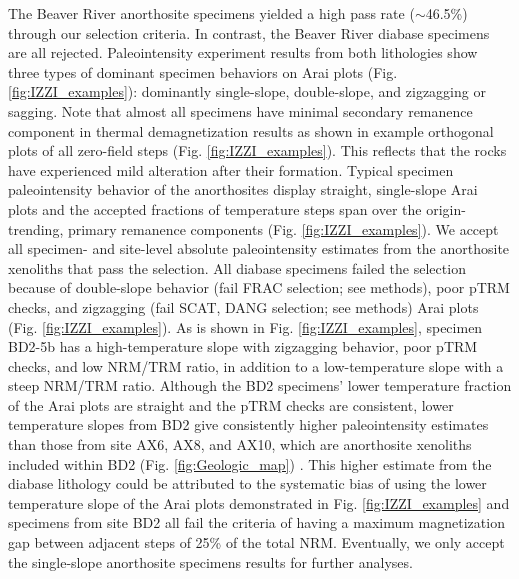 \documentclass[9pt,twocolumn,twoside,lineno]{pnas-new}
\begin{document}
The Beaver River anorthosite specimens yielded a high pass rate ($\sim$46.5\%) through our selection criteria. In contrast, the Beaver River diabase specimens are all rejected. Paleointensity experiment results from both lithologies show three types of dominant specimen behaviors on Arai plots (Fig. \ref{fig:IZZI_examples}): dominantly single-slope, double-slope, and zigzagging or sagging. Note that almost all specimens have minimal secondary remanence component in thermal demagnetization results as shown in example orthogonal plots of all zero-field steps (Fig. \ref{fig:IZZI_examples}). This reflects that the rocks have experienced mild alteration after their formation. Typical specimen paleointensity behavior of the anorthosites display straight, single-slope Arai plots and the accepted fractions of temperature steps span over the origin-trending, primary remanence components (Fig. \ref{fig:IZZI_examples}). We accept all specimen- and site-level absolute paleointensity estimates from the anorthosite xenoliths that pass the selection. All diabase specimens failed the selection because of double-slope behavior (fail FRAC selection; see methods), poor pTRM checks, and zigzagging (fail SCAT, DANG selection; see methods) Arai plots (Fig. \ref{fig:IZZI_examples}). As is shown in Fig. \ref{fig:IZZI_examples}, specimen BD2-5b has a high-temperature slope with zigzagging behavior, poor pTRM checks, and low NRM/TRM ratio, in addition to a low-temperature slope with a steep NRM/TRM ratio. Although the BD2 specimens' lower temperature fraction of the Arai plots are straight and the pTRM checks are consistent, lower temperature slopes from BD2 give consistently higher paleointensity estimates than those from site AX6, AX8, and AX10, which are anorthosite xenoliths included within BD2 (Fig. \ref{fig:Geologic_map}) \cite{Zhang2021a}. This higher estimate from the diabase lithology could be attributed to the systematic bias of using the lower temperature slope of the Arai plots demonstrated in Fig. \ref{fig:IZZI_examples} and specimens from site BD2 all fail the criteria of having a maximum magnetization gap between adjacent steps of 25\% of the total NRM. Eventually, we only accept the single-slope anorthosite specimens results for further analyses. 

\end{document}
